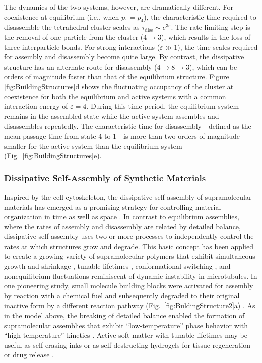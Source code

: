 \begin{appendices}
The dynamics of the two systems, however, are dramatically different.  For coexistence at equilibrium (i.e., when $p_1=p_4$), the characteristic time required to disassemble the tetrahedral cluster scales as $\tau_{\text{diss}}\sim e^{3\varepsilon}$.  The rate limiting step is the removal of one particle from the cluster ($4\rightarrow 3$), which results in the loss of three interparticle bonds.  For strong interactions ($\varepsilon\gg1$), the time scales required for assembly and disassembly become quite large.  By contrast, the dissipative structure has an alternate route for disassembly ($4\rightarrow 8\rightarrow 3$), which can be orders of magnitude faster than that of the equilibrium structure.  Figure \ref{fig:BuildingStructures}d shows the fluctuating occupancy of the cluster at coexistence for both the equilibrium and active systems with a common interaction energy of $\varepsilon=4$.  During this time period, the equilibrium system remains in the assembled state while the active system assembles and disassembles repeatedly.  The characteristic time for disassembly---defined as the mean passage time from state 4 to 1---is more than two orders of magnitude smaller for the active system than the equilibrium system (Fig.~\ref{fig:BuildingStructures}e). 

\subsubsection{Dissipative Self-Assembly of Synthetic Materials}

Inspired by the cell cytoskeleton, the dissipative self-assembly of supramolecular materials has emerged as a promising strategy for controlling material organization in time as well as space \autocite{VanRossum2017, De2018}. In contrast to equilibrium assemblies, where the rates of assembly and disassembly are related by detailed balance, dissipative self-assembly uses two or more processes to independently control the rates at which structures grow and degrade.  This basic concept has been applied to create a growing variety of supramolecular polymers \autocite{Sorrenti2017} that exhibit simultaneous growth and shrinkage \autocite{boekhoven2015transient}, tunable lifetimes \autocite{Tena-Solsona2017}, conformational switching \autocite{dhiman2017transient}, and nonequilibrium fluctuations \autocite{boekhoven2015transient} reminiscent of dynamic instability in microtubules. In one pioneering study, small molecule building blocks were activated for assembly by reaction with a chemical fuel and subsequently degraded to their original inactive form by a different reaction pathway (Fig.~\ref{fig:BuldingStructure2}a) \autocite{boekhoven2015transient}. As in the model above, the breaking of detailed balance enabled the formation of supramolecular assemblies that exhibit ``low-temperature'' phase behavior with ``high-temperature'' kinetics \autocite{marsland2018active}.  Active soft matter with tunable lifetimes may be useful as self-erasing inks or as self-destructing hydrogels for tissue regeneration or drug release \autocite{Rieß2018}.


\end{appendices}
